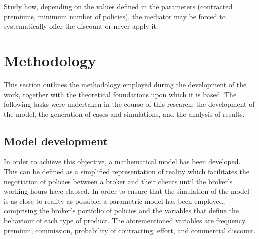 \documentclass[review]{elsarticle}
\begin{document}
Study how, depending on the values defined in the parameters (contracted premiums, minimum number of policies), the mediator may be forced to systematically offer the discount or never apply it.





\section{Methodology}

This section outlines the methodology employed during the development of the work, together with the theoretical foundations upon which it is based.
The following tasks were undertaken in the course of this research: the development of the model, the generation of cases and simulations, and the analysis of results.

\subsection{Model development}

In order to achieve this objective, a mathematical model has been developed. This can be defined as a simplified representation of reality which facilitates the negotiation of policies between a broker and their clients until the broker's working hours have elapsed.
In order to ensure that the simulation of the model is as close to reality as possible, a parametric model has been employed, comprising the broker's portfolio of policies and the variables that define the behaviour of each type of product. The aforementioned variables are frequency, premium, commission, probability of contracting, effort, and commercial discount.
\end{document}
